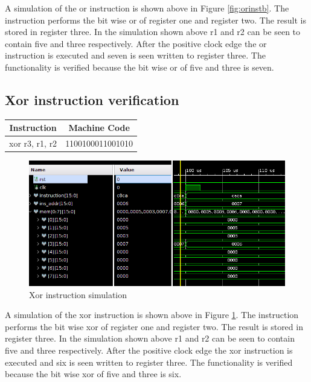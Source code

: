 \documentclass{article}
\begin{document}
		\begin{par}
			A simulation of the or instruction is shown above in Figure \ref{fig:orinstb}. The instruction performs the bit wise or of register one and register two. The result is stored in register three. In the simulation shown above r1 and r2 can be seen to contain five and three respectively. After the positive clock edge the or instruction is executed and seven is seen written to register three. The functionality is verified because the bit wise or of five and three is seven. 
		\end{par}
		\newpage
		
	\subsection{Xor instruction verification}
		\vspace{.5cm}
		\begin{center}
			\begin{tabular}{|c|c|}
				\hline 
				\textbf{Instruction} & \textbf{Machine Code} \\ 
				\hline 
				xor r3, r1, r2 & 1100100011001010 \\ 
				\hline 
			\end{tabular} 
		\end{center}
		
		\begin{figure}[H]
			\centering
			\includegraphics[width=5in]{img/xorinstest.png}
			\caption{Xor instruction simulation}
			\label{fig:xorinstest}
		\end{figure}
		
		\begin{par}
			A simulation of the xor instruction is shown above in Figure \ref{fig:xorinstest}. The instruction performs the bit wise xor of register one and register two. The result is stored in register three. In the simulation shown above r1 and r2 can be seen to contain five and three respectively. After the positive clock edge the xor instruction is executed and six is seen written to register three. The functionality is verified because the bit wise xor of five and three is six. 
		\end{par}
		\newpage
\end{document}
